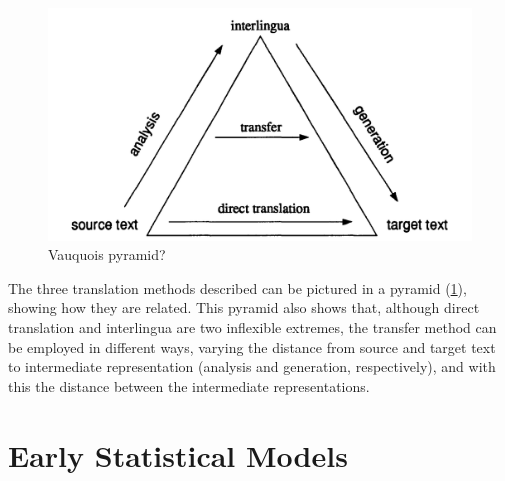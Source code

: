 \documentclass{report}
\theoremstyle{definition}
\theoremstyle{plain}
\begin{document}
\begin{figure}[!ht]
\includegraphics[scale=0.2]{translation_triangle.png}
\caption{Vauquois pyramid?}\label{fig:triangle}
\end{figure}

The three translation methods described can be pictured in a pyramid (\ref{fig:triangle}), showing how they are related. This pyramid also shows that, although direct translation and interlingua are two inflexible extremes, the transfer method can be employed in different ways, varying the distance from source and target text to intermediate representation (analysis and generation, respectively), and with this the distance between the intermediate representations.

\section{Early Statistical Models}
\end{document}
